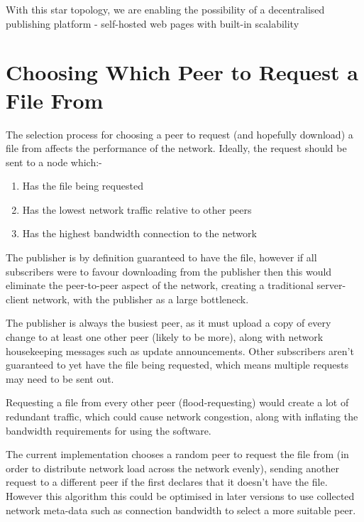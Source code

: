 \documentclass[12pt,a4paper,]{adreport}
\begin{document}
With this star topology, we are enabling the possibility of a
decentralised publishing platform - self-hosted web pages with built-in
scalability

\section{Choosing Which Peer to Request a File
From}\label{choosing-which-peer-to-request-a-file-from}

The selection process for choosing a peer to request (and hopefully
download) a file from affects the performance of the network. Ideally,
the request should be sent to a node which:-

\begin{enumerate}
\def\labelenumi{\arabic{enumi}.}
\itemsep1pt\parskip0pt
\item
  Has the file being requested
\item
  Has the lowest network traffic relative to other peers
\item
  Has the highest bandwidth connection to the network
\end{enumerate}

The publisher is by definition guaranteed to have the file, however if
all subscribers were to favour downloading from the publisher then this
would eliminate the peer-to-peer aspect of the network, creating a
traditional server-client network, with the publisher as a large
bottleneck.

The publisher is always the busiest peer, as it must upload a copy of
every change to at least one other peer (likely to be more), along with
network housekeeping messages such as update announcements. Other
subscribers aren't guaranteed to yet have the file being requested,
which means multiple requests may need to be sent out.

Requesting a file from every other peer (flood-requesting) would create
a lot of redundant traffic, which could cause network congestion, along
with inflating the bandwidth requirements for using the software.

The current implementation chooses a random peer to request the file
from (in order to distribute network load across the network evenly),
sending another request to a different peer if the first declares that
it doesn't have the file. However this algorithm this could be optimised
in later versions to use collected network meta-data such as connection
bandwidth to select a more suitable peer.
\end{document}
